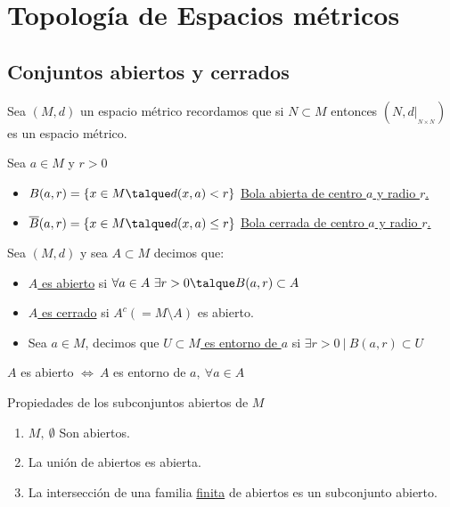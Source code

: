 \chapter{Topología de Espacios métricos}
	\section{Conjuntos abiertos y cerrados}
	\begin{nota}
		Sea $(M,d)$ un espacio m\'etrico recordamos que si $N\subset M$ entonces $(N,d|_{_{N\times N}})$ es un espacio m\'etrico.
	\end{nota}
	
	\begin{defi} Sea $a\in M $ y $r>0$
		\begin{itemize}
			\item $B(a,r)= \{ x\in M\talque d(x,a)<r\}$ \underline{Bola abierta de centro $a$ y radio 				$r$.}
			\item $\overline{B}(a,r)=\{ x\in M\talque d(x,a)\leq r\}$ \underline{Bola cerrada de centro $a$ y radio $r$.}
		\end{itemize}
	\end{defi}
	
	\begin{defi} Sea $(M,d)$ y sea $A \subset M$ decimos que:
		\begin{itemize}
			\item \underline{$A$ es abierto} si $\forall a \in A \ \exists r>0\talque B(a,r) \subset A$
			\item \underline{$A$ es cerrado} si $A^c(=M\setminus A)$ es abierto.
			\item Sea $a\in M$, decimos que \underline{$U\subset M$ es entorno de $a$} si $\exists r>0\ | 				\ B(a,r) \subset U$
		\end{itemize}
	\end{defi}
	
	\begin{proposicion}
		$A$ es abierto $\iff \ A$ es entorno de $a,\ \forall a \in A$
	\end{proposicion}
	
	\begin{proposicion}Propiedades de los subconjuntos abiertos de $M$
		\begin{enumerate}[1)]
 			\item $M,\ \emptyset$ Son abiertos.
 			\item La uni\'on de abiertos es abierta.
 			\item La intersecci\'on de una familia \underline{finita} de abiertos es un subconjunto 						abierto.
		\end{enumerate}
	\end{proposicion}

